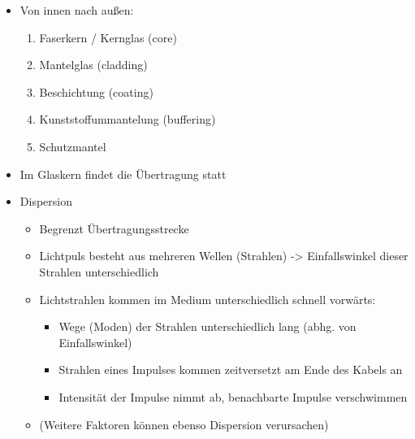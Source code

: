 \begin{itemize}
    \item Von innen nach außen:
    \begin{enumerate}
        \item Faserkern / Kernglas (core)
        \item Mantelglas (cladding)
        \item Beschichtung (coating)
        \item Kunststoffummantelung (buffering)
        \item Schutzmantel
    \end{enumerate}
    \item Im Glaskern findet die Übertragung statt
\end{itemize}

\begin{itemize}
    \item Dispersion
    \begin{itemize}
        \item Begrenzt Übertragungsstrecke
        \item Lichtpuls besteht aus mehreren Wellen (Strahlen) -> Einfallswinkel dieser Strahlen unterschiedlich
        \item Lichtstrahlen kommen im Medium unterschiedlich schnell vorwärts:
        \begin{itemize}
            \item Wege (Moden) der Strahlen unterschiedlich lang (abhg. von Einfallswinkel)
            \item Strahlen eines Impulses kommen zeitversetzt am Ende des Kabels an
            \item Intensität der Impulse nimmt ab, benachbarte Impulse verschwimmen
        \end{itemize}
        \item (Weitere Faktoren können ebenso Dispersion verursachen)
    \end{itemize}
\end{itemize}

